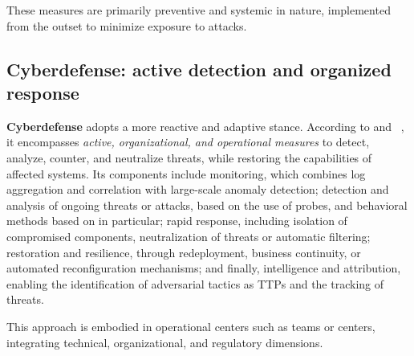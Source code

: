 These measures are primarily preventive and systemic in nature, implemented from the outset to minimize exposure to attacks.

\subsection*{Cyberdefense: active detection and organized response}

\textbf{Cyberdefense} adopts a more reactive and adaptive stance. According to  and ~\cite{ANSSI2024,NATO2016Cyberdef}, it encompasses \emph{active, organizational, and operational measures} to detect, analyze, counter, and neutralize threats, while restoring the capabilities of affected systems. Its components include monitoring, which combines log aggregation and correlation with large-scale anomaly detection; detection and analysis of ongoing threats or attacks, based on the use of probes,  and behavioral methods based on  in particular; rapid response, including isolation of compromised components, neutralization of threats or automatic filtering; restoration and resilience, through redeployment, business continuity, or automated reconfiguration mechanisms; and finally, intelligence and attribution, enabling the identification of adversarial tactics as TTPs and the tracking of threats.

This approach is embodied in operational centers such as  teams or  centers, integrating technical, organizational, and regulatory dimensions.




